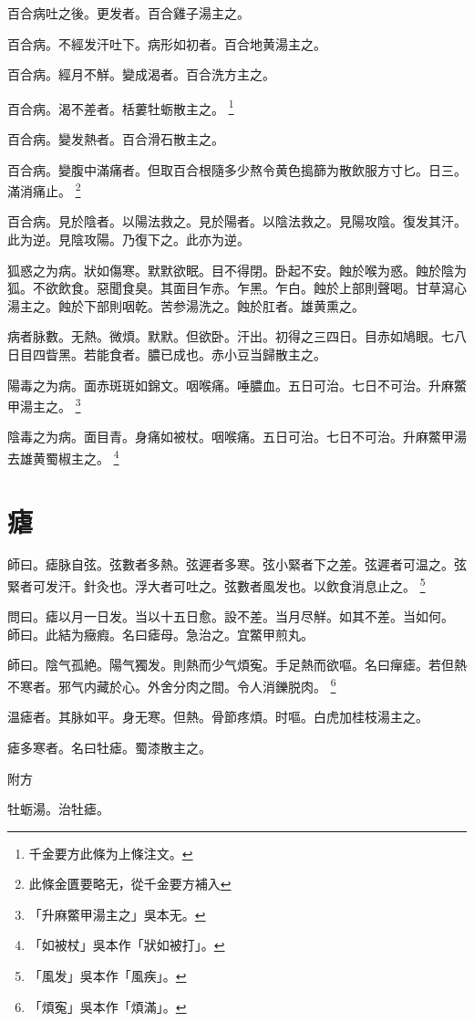 \documentclass[12pt,twoside,UTF8,b5paper]{ctexbook}
\begin{document}
百合病吐之後。更发者。百合雞子湯主之。

百合病。不經发汗吐下。病形如初者。百合地黄湯主之。

百合病。經月不觧。變成渴者。百合洗方主之。

百合病。渴不差者。栝蔞牡蛎散主之。
	\footnote{千金要方此條为上條注文。}

百合病。變发熱者。百合滑石散主之。

百合病。變腹中滿痛者。但取百合根隨多少熬令黄色搗篩为散飲服方寸匕。日三。滿消痛止。
	\footnote{此條金匱要略无，從千金要方補入}

百合病。見於陰者。以陽法救之。見於陽者。以陰法救之。見陽攻陰。復发其汗。此为逆。見陰攻陽。乃復下之。此亦为逆。

狐惑之为病。狀如傷寒。默默欲眠。目不得閉。卧起不安。蝕於喉为惑。蝕於陰为狐。不欲飲食。惡聞食臭。其面目乍赤。乍黑。乍白。蝕於上部則聲喝。甘草瀉心湯主之。蝕於下部則咽乾。苦参湯洗之。蝕於肛者。雄黄熏之。

病者脉數。无熱。微煩。默默。但欲卧。汗出。初得之三四日。目赤如鳩眼。七八日目四眥黑。若能食者。膿已成也。赤{小}豆当歸散主之。

陽毒之为病。面赤斑斑如錦文。咽喉痛。唾膿血。五日可治。七日不可治。升麻鱉甲湯主之。
	\footnote{「升麻鱉甲湯主之」吳本无。}

陰毒之为病。面目青。身痛如被杖。咽喉痛。五日可治。七日不可治。升麻鱉甲湯去雄黄蜀椒主之。
	\footnote{「如被杖」吳本作「狀如被打」。}

\chapter{瘧}

師曰。瘧脉自弦。弦數者多熱。弦遲者多寒。弦小緊者下之差。弦遲者可温之。弦緊者可发汗。針灸也。浮大者可吐之。弦數者風发也。以飲食消息止之。
	\footnote{「風发」吳本作「風疾」。}

問曰。瘧以月一日发。当以十五日愈。設不差。当月尽觧。如其不差。当如何。\\
師曰。此結为癥瘕。名曰瘧母。急治之。宜鱉甲煎丸。

師曰。陰气孤絶。陽气獨发。則熱而少气煩寃。手足熱而欲嘔。名曰癉瘧。若但熱不寒者。邪气内藏於心。外舍分肉之間。令人消鑠脱肉。
	\footnote{「煩寃」吳本作「煩滿」。}

温瘧者。其脉如平。身无寒。但熱。骨節疼煩。时嘔。白虎加桂枝湯主之。

瘧多寒者。名曰牡瘧。蜀漆散主之。

附方

牡蛎湯。治牡瘧。
\end{document}
